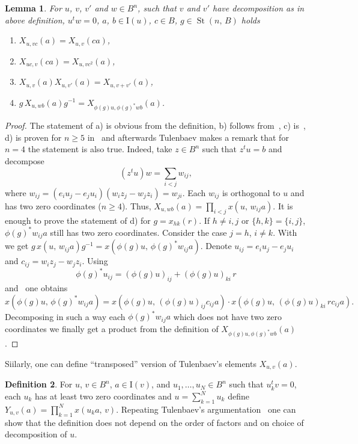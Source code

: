 \documentclass[11pt]{amsart}
\theoremstyle{plain} \declaretheorem[name=Theorem, Refname={Theorem,Theorems}]{tm} \Crefname{tm}{Theorem}{Theorems}
\numberwithin{equation}{section}
\newtheorem{lm}{Lemma} \numberwithin{lm}{section} \Crefname{lm}{Lemma}{Lemmas}
\theoremstyle{definition} \newtheorem{df}[lm]{Definition} \Crefname{df}{Definition}{Definitions}
\theoremstyle{remark} \newtheorem{rk}[lm]{Remark} \Crefname{rk}{Remark}{Remarks}
\newcommand{\St}{\mathop{\mathrm{St}}\nolimits}
\newcommand{\inv}{^{-1}}
\begin{document}
\begin{lm}
\label{xproperties}
For $u$, $v$, $v'$ and $w\in B^n$, such that $v$ and $v'$ have decomposition as in above definition, $u^tw=0$, $a$, $b\in\mathrm I(u)$, $c\in B$, $g\in\St(n,\,B)$ holds
\begin{enumerate}
\item
$X_{u,vc}(a)=X_{u,v}(ca)$,
\item
$X_{uc,v}(ca)=X_{u,vc^2}(a)$,
\item
$X_{u,v}(a)X_{u,v'}(a)=X_{u,v+v'}(a)$,
\item
$g\,X_{u,wb}(a)g\inv=X_{\phi(g)u,\phi(g)^*wb}(a)$.
\end{enumerate}
\end{lm}

\begin{proof}
The statement of a) is obvious from the definition, b) follows from~\cite[Lem.~1.1\,d)]{Tul}, c) is~\cite[Lem.~1.3\,a)]{Tul}, d) is proven for $n\geq5$ in~\cite[Lem.~1.3\,b)]{Tul} and afterwards Tulenbaev makes a remark that for $n=4$ the statement is also true. Indeed, take $z\in B^n$ such that $z^tu=b$ and decompose
$$
(z^tu)w=\sum_{i<j}w_{ij},
$$
where $w_{ij}=(e_iu_j-e_ju_i)(w_iz_j-w_jz_i)=w_{ji}$. Each $w_{ij}$ is orthogonal to $u$ and has two zero coordinates ($n\geq4$). Thus, $X_{u,wb}(a)=\prod_{i<j}x(u,\,w_{ij}a)$. It is enough to prove the statement of d) for $g=x_{hk}(r)$. If $h\neq i,j$ or $\{h,k\}=\{i,j\}$, $\phi(g)^*w_{ij}a$ still has two zero coordinates. Consider the case $j=h$, $i\neq k$. With~\cite[3.12]{vdK} we get $g\,x(u,\,w_{ij}a)g\inv=x(\phi(g)u,\,\phi(g)^*w_{ij}a)$. Denote $u_{ij}=e_iu_j-e_ju_i$ and $c_{ij}=w_iz_j-w_jz_i$. Using
$$
\phi(g)^*u_{ij}=(\phi(g)u)_{ij}+(\phi(g)u)_{ki}\,r
$$
and~\cite[3.11]{vdK} one obtains
$$
x(\phi(g)u,\,\phi(g)^*w_{ij}a)=x(\phi(g)u,\,(\phi(g)u)_{ij}c_{ij}a)\cdot x(\phi(g)u,\,(\phi(g)u)_{ki}\,rc_{ij}a).
$$
Decomposing in such a way each $\phi(g)^*w_{ij}a$ which does not have two zero coordinates we finally get a product from the definition of $X_{\phi(g)u,\phi(g)^*wb}(a)$.
\end{proof}

Siilarly, one can define ``transposed'' version of Tulenbaev's elements $X_{u,v}(a)$.

\begin{df}
For $u$, $v\in B^n$, $a\in\mathrm I(v)$, and $u_1,\ldots,u_N\in B^n$ such that $u_k^tv=0$, each $u_k$ has at least two zero coordinates and $u=\sum_{k=1}^Nu_k$ define $Y_{u,v}(a)=\prod\limits_{k=1}^Nx(u_ka,\,v)$. Repeating Tulenbaev's argumentation~\cite[p.~3]{Tul} one can show that the definition does not depend on the order of factors and on choice of decomposition of $u$.
\end{df}
\end{document}
